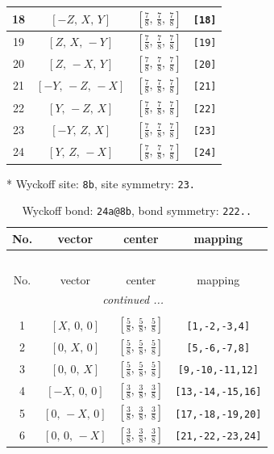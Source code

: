 \documentclass[fleqn,8pt]{jsarticle}
\begin{document}
\begin{longtable}{cccc}
18 & $\left[ - Z,\, X,\, Y \right]$ & $\left[ \frac{7}{8},\, \frac{7}{8},\, \frac{7}{8} \right]$ & {\tt [18]} \\ \hline
19 & $\left[ Z,\, X,\, - Y \right]$ & $\left[ \frac{7}{8},\, \frac{7}{8},\, \frac{7}{8} \right]$ & {\tt [19]} \\ \hline
20 & $\left[ Z,\, - X,\, Y \right]$ & $\left[ \frac{7}{8},\, \frac{7}{8},\, \frac{7}{8} \right]$ & {\tt [20]} \\ \hline
21 & $\left[ - Y,\, - Z,\, - X \right]$ & $\left[ \frac{7}{8},\, \frac{7}{8},\, \frac{7}{8} \right]$ & {\tt [21]} \\ \hline
22 & $\left[ Y,\, - Z,\, X \right]$ & $\left[ \frac{7}{8},\, \frac{7}{8},\, \frac{7}{8} \right]$ & {\tt [22]} \\ \hline
23 & $\left[ - Y,\, Z,\, X \right]$ & $\left[ \frac{7}{8},\, \frac{7}{8},\, \frac{7}{8} \right]$ & {\tt [23]} \\ \hline
24 & $\left[ Y,\, Z,\, - X \right]$ & $\left[ \frac{7}{8},\, \frac{7}{8},\, \frac{7}{8} \right]$ & {\tt [24]} \\
\end{longtable}
* Wyckoff site: {\tt 8b}, site symmetry: {\tt 23.}
\renewcommand{\arraystretch}{1.2}
\begin{longtable}{cccc}
\caption{Wyckoff bond: {\tt 24a@8b}, bond symmetry: {\tt 222..}}
 \\
 \hline \hline
No. & vector & center & mapping \\ \hline \endfirsthead

\multicolumn{3}{l}{\tablename\ \thetable{}} \\
 \hline \hline
No. & vector & center & mapping \\ \hline \endhead

 \hline \hline
\multicolumn{3}{r}{\footnotesize\it continued ...} \\ \endfoot

 \hline \hline
\multicolumn{3}{r}{} \\ \endlastfoot

1 & $\left[ X,\, 0,\, 0 \right]$ & $\left[ \frac{5}{8},\, \frac{5}{8},\, \frac{5}{8} \right]$ & {\tt [1,-2,-3,4]} \\ \hline
2 & $\left[ 0,\, X,\, 0 \right]$ & $\left[ \frac{5}{8},\, \frac{5}{8},\, \frac{5}{8} \right]$ & {\tt [5,-6,-7,8]} \\ \hline
3 & $\left[ 0,\, 0,\, X \right]$ & $\left[ \frac{5}{8},\, \frac{5}{8},\, \frac{5}{8} \right]$ & {\tt [9,-10,-11,12]} \\ \hline
4 & $\left[ - X,\, 0,\, 0 \right]$ & $\left[ \frac{3}{8},\, \frac{3}{8},\, \frac{3}{8} \right]$ & {\tt [13,-14,-15,16]} \\ \hline
5 & $\left[ 0,\, - X,\, 0 \right]$ & $\left[ \frac{3}{8},\, \frac{3}{8},\, \frac{3}{8} \right]$ & {\tt [17,-18,-19,20]} \\ \hline
6 & $\left[ 0,\, 0,\, - X \right]$ & $\left[ \frac{3}{8},\, \frac{3}{8},\, \frac{3}{8} \right]$ & {\tt [21,-22,-23,24]} \\
\end{longtable}
\end{document}
